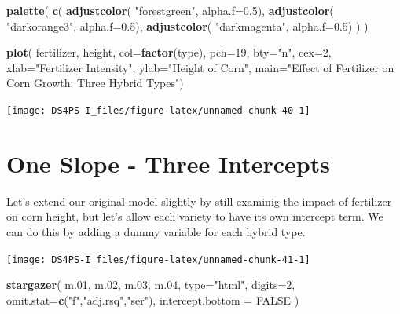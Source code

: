 \documentclass[]{book}
\newenvironment{Shaded}{\begin{snugshade}}{\end{snugshade}}
\newcommand{\DataTypeTok}[1]{\textcolor[rgb]{0.13,0.29,0.53}{#1}}
\newcommand{\DecValTok}[1]{\textcolor[rgb]{0.00,0.00,0.81}{#1}}
\newcommand{\FloatTok}[1]{\textcolor[rgb]{0.00,0.00,0.81}{#1}}
\newcommand{\KeywordTok}[1]{\textcolor[rgb]{0.13,0.29,0.53}{\textbf{#1}}}
\newcommand{\NormalTok}[1]{#1}
\newcommand{\OtherTok}[1]{\textcolor[rgb]{0.56,0.35,0.01}{#1}}
\newcommand{\StringTok}[1]{\textcolor[rgb]{0.31,0.60,0.02}{#1}}
\theoremstyle{definition}
\theoremstyle{definition}
\theoremstyle{definition}
\theoremstyle{remark}
\begin{document}
\begin{Shaded}
\begin{Highlighting}[]


\KeywordTok{palette}\NormalTok{( }\KeywordTok{c}\NormalTok{( }\KeywordTok{adjustcolor}\NormalTok{( }\StringTok{"forestgreen"}\NormalTok{, }\DataTypeTok{alpha.f=}\FloatTok{0.5}\NormalTok{), }
            \KeywordTok{adjustcolor}\NormalTok{( }\StringTok{"darkorange3"}\NormalTok{, }\DataTypeTok{alpha.f=}\FloatTok{0.5}\NormalTok{),}
            \KeywordTok{adjustcolor}\NormalTok{( }\StringTok{"darkmagenta"}\NormalTok{, }\DataTypeTok{alpha.f=}\FloatTok{0.5}\NormalTok{) ) )}
            
\KeywordTok{plot}\NormalTok{( fertilizer, height, }\DataTypeTok{col=}\KeywordTok{factor}\NormalTok{(type), }\DataTypeTok{pch=}\DecValTok{19}\NormalTok{, }\DataTypeTok{bty=}\StringTok{"n"}\NormalTok{, }\DataTypeTok{cex=}\DecValTok{2}\NormalTok{,}
      \DataTypeTok{xlab=}\StringTok{"Fertilizer Intensity"}\NormalTok{, }\DataTypeTok{ylab=}\StringTok{"Height of Corn"}\NormalTok{, }
      \DataTypeTok{main=}\StringTok{"Effect of Fertilizer on Corn Growth: Three Hybrid Types"}\NormalTok{)}
\end{Highlighting}
\end{Shaded}

\begin{center}\texttt{[image: DS4PS-I\_files/figure-latex/unnamed-chunk-40-1]} \end{center}

\hypertarget{one-slope---three-intercepts}{%
\section{One Slope - Three
Intercepts}\label{one-slope---three-intercepts}}

Let's extend our original model slightly by still examinig the impact of
fertilizer on corn height, but let's allow each variety to have its own
intercept term. We can do this by adding a dummy variable for each
hybrid type.

\begin{center}\texttt{[image: DS4PS-I\_files/figure-latex/unnamed-chunk-41-1]} \end{center}

\begin{Shaded}
\begin{Highlighting}[]


\KeywordTok{stargazer}\NormalTok{( m}\FloatTok{.01}\NormalTok{, m}\FloatTok{.02}\NormalTok{, m}\FloatTok{.03}\NormalTok{, m}\FloatTok{.04}\NormalTok{, }\DataTypeTok{type=}\StringTok{"html"}\NormalTok{, }
           \DataTypeTok{digits=}\DecValTok{2}\NormalTok{, }
          \DataTypeTok{omit.stat=}\KeywordTok{c}\NormalTok{(}\StringTok{"f"}\NormalTok{,}\StringTok{"adj.rsq"}\NormalTok{,}\StringTok{"ser"}\NormalTok{),}
           \DataTypeTok{intercept.bottom =} \OtherTok{FALSE}\NormalTok{ ) }
\end{Highlighting}
\end{Shaded}
\end{document}
